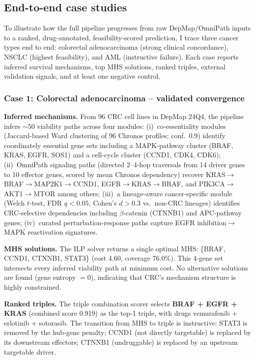 \documentclass[11pt]{article}
\begin{document}
\subsection{End-to-end case studies}
\label{sec:case_studies}
To illustrate how the full pipeline progresses from raw DepMap/OmniPath inputs to a ranked, drug-annotated, feasibility-scored prediction, I trace three cancer types end to end: colorectal adenocarcinoma (strong clinical concordance), NSCLC (highest feasibility), and AML (instructive failure). Each case reports inferred survival mechanisms, top MHS solutions, ranked triples, external validation signals, and at least one negative control.

\subsubsection{Case 1: Colorectal adenocarcinoma -- validated convergence}

\textbf{Inferred mechanisms.} From 96 CRC cell lines in DepMap 24Q4, the pipeline infers $\sim$50 viability paths across four modules: (i)~co-essentiality modules (Jaccard-based Ward clustering of 96 Chronos profiles; conf.~0.9) identify coordinately essential gene sets including a MAPK-pathway cluster (BRAF, KRAS, EGFR, SOS1) and a cell-cycle cluster (CCND1, CDK4, CDK6); (ii)~OmniPath signaling paths (directed 2--4-hop traversals from 14 driver genes to 10 effector genes, scored by mean Chronos dependency) recover KRAS$\to$BRAF$\to$MAP2K1$\to$CCND1, EGFR$\to$KRAS$\to$BRAF, and PIK3CA$\to$AKT1$\to$MTOR among others; (iii)~a lineage-aware cancer-specific module (Welch $t$-test, FDR $q < 0.05$, Cohen's $d > 0.3$ vs.\ non-CRC lineages) identifies CRC-selective dependencies including $\beta$-catenin (CTNNB1) and APC-pathway genes; (iv)~curated perturbation-response paths capture EGFR inhibition$\to$MAPK reactivation signatures.

\textbf{MHS solutions.} The ILP solver returns a single optimal MHS: \{BRAF, CCND1, CTNNB1, STAT3\} (cost 4.60, coverage 76.0\%). This 4-gene set intersects every inferred viability path at minimum cost. No alternative solutions are found (gene entropy $= 0$), indicating that CRC's mechanism structure is highly constrained.

\textbf{Ranked triples.} The triple combination scorer selects \textbf{BRAF + EGFR + KRAS} (combined score 0.919) as the top-1 triple, with drugs vemurafenib + erlotinib + sotorasib. The transition from MHS to triple is instructive: STAT3 is removed by the hub-gene penalty; CCND1 (not directly targetable) is replaced by its downstream effectors; CTNNB1 (undruggable) is replaced by an upstream targetable driver.
\end{document}
